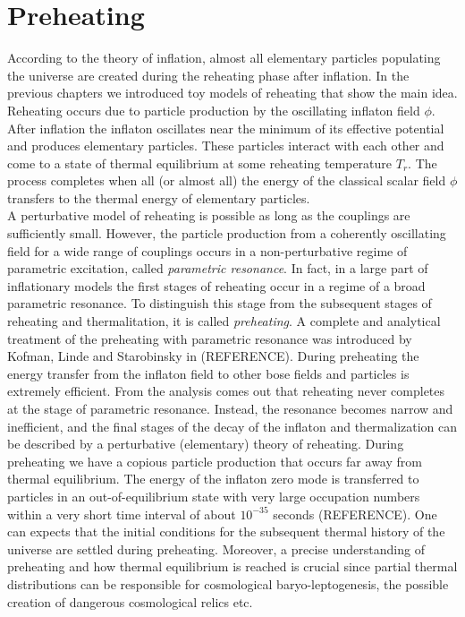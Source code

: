 \documentclass[11pt,a4paper,twoside]{book}
\begin{document}
\chapter{Preheating}
According to the theory of inflation, almost all elementary particles populating the universe are created during the reheating phase after inflation. In the previous chapters we introduced toy models of reheating that show the main idea. Reheating occurs due to particle production by the oscillating inflaton field $ \phi$. After inflation the inflaton oscillates near the minimum of its effective potential and produces elementary particles. These particles interact with each other and come to a state of thermal equilibrium at some reheating temperature $ T_{r} $. The process completes when all (or almost all) the energy of the classical scalar field $\phi$ transfers to the thermal energy of elementary particles. \\
A perturbative model of reheating is possible as long as the couplings are sufficiently small. However, the particle production from a coherently oscillating field for a wide range of couplings occurs in a non-perturbative regime of parametric excitation, called \textit{parametric resonance}. In fact, in a large part of inflationary models the first stages of reheating occur in a regime of a broad parametric resonance. To distinguish this stage from the subsequent stages of reheating and thermalitation, it is called \textit{preheating}. A complete and analytical treatment of the preheating with parametric resonance was introduced by Kofman, Linde and Starobinsky in (REFERENCE). During preheating the energy transfer from the inflaton field to other bose fields and particles is extremely efficient. From the analysis comes out that reheating never completes at the stage of parametric resonance. Instead, the resonance becomes narrow and inefficient, and the final stages of the decay of the inflaton and thermalization can be described by a perturbative (elementary) theory of reheating. During preheating we have a copious particle production that occurs far away from thermal equilibrium. The energy of the inflaton zero mode is transferred to particles in an out-of-equilibrium state with very large occupation numbers within a very short time interval of about $ 10^{-35} $ seconds (REFERENCE). One can expects that the initial conditions for the subsequent thermal history of the universe are settled during preheating. Moreover, a precise understanding of preheating and how thermal equilibrium is reached is crucial since partial thermal distributions can be responsible for cosmological baryo-leptogenesis, the possible creation of dangerous cosmological relics etc.\\
\end{document}
